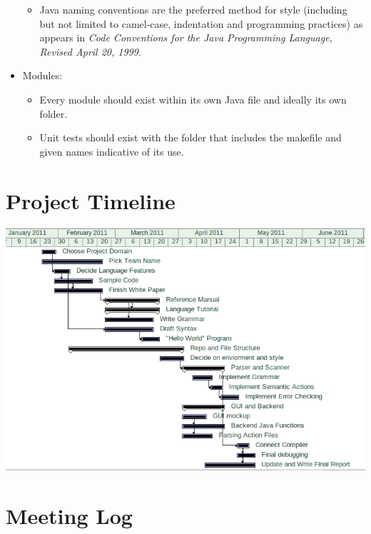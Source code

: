 \documentclass[12pt]{report}
\begin{document}
\begin{itemize}
\begin{itemize}
\item Java naming conventions are the preferred method for style (including but not limited to camel-case, indentation and programming practices) as appears in \textit{Code Conventions for the Java Programming Language, Revised April 20, 1999}.
\end{itemize}
\item Modules:
\begin{itemize}
\item Every module should exist within its own Java file and ideally its own folder.
\item Unit tests should exist with the folder that includes the makefile and given names indicative of its use.
\end{itemize}
\end{itemize}

\section{Project Timeline}

\includegraphics[scale=0.7]{project_timeline.png}

\section{Meeting Log}
\end{document}

